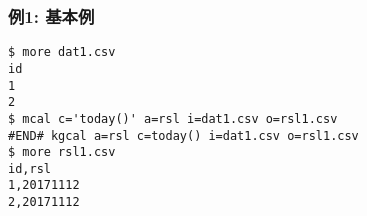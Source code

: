 \subsubsection*{例1: 基本例}



\begin{Verbatim}[baselinestretch=0.7,frame=single]
$ more dat1.csv
id
1
2
$ mcal c='today()' a=rsl i=dat1.csv o=rsl1.csv
#END# kgcal a=rsl c=today() i=dat1.csv o=rsl1.csv
$ more rsl1.csv
id,rsl
1,20171112
2,20171112
\end{Verbatim}
